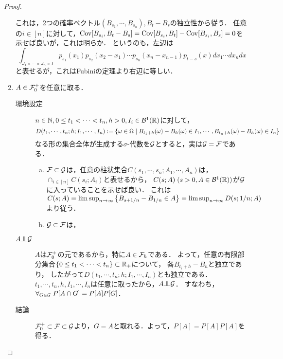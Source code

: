 \documentclass[uplatex,dvipdfmx]{jsreport}
\begin{document}
\begin{proof}
\begin{enumerate}
        これは，2つの確率ベクトル$(B_{s_1},\cdots,B_{s_n}),B_t-B_s$の独立性から従う．
        任意の$i\in[n]$に対して，$\mathrm{Cov}[B_{s_i},B_t-B_s]=\mathrm{Cov}[B_{s_i},B_t]-\mathrm{Cov}[B_{s_i},B_s]=0$を示せば良いが，これは明らか．
        というのも，左辺は
        \[\int_{J_1\times\cdots\times J_n\times I}p_{s_1}(x_1)p_{s_2}(x_2-x_1)\cdots p_{s_n}(x_n-x_{n-1})p_{t-s}(x)dx_1\cdots dx_ndx\]
        と表せるが，これはFubiniの定理より右辺に等しい．
        \item 
        $A\in\mathcal{F}^+_0$を任意に取る．
        \begin{description}
            \item[環境設定] $n\in\mathbb{N},0\le t_1<\cdots<t_n,h>0,I_i\in\mathcal{B}^1(\mathbb{R})$に対して，
            \[D(t_1,\cdots,t_n;h;I_1,\cdots,I_n):=\left\{\omega\in\Omega\mid B_{t_1+h}(\omega)-B_{h}(\omega)\in I_1,\cdots,B_{t_n+h}(\omega)-B_h(\omega)\in I_n\right\}\]
            なる形の集合全体が生成する$\sigma$-代数を$\mathcal{G}$とすると，実は$\mathcal{G}=\mathcal{F}$である．
            \begin{enumerate}[(a)]
                \item $\mathcal{F}\subset\mathcal{G}$は，任意の柱状集合$C(s_1,\cdots,s_n;A_1,\cdots,A_n)$は，$\cap_{i\in[n]}C(s_i;A_i)$と表せるから，
                $C(s;A)\;(s>0,A\in\mathcal{B}^1(\mathbb{R}))$が$\mathcal{G}$に入っていることを示せば良い．
                これは$C(s;A)=\limsup_{n\to\infty}\left\{B_{s+1/n}-B_{1/n}\in A\right\}=\limsup_{n\to\infty}D(s;1/n;A)$より従う．
                \item $\mathcal{G}\subset\mathcal{F}$は，
            \end{enumerate}
            \item[$A\indep\cG$] $A$は$\mathcal{F}^+_0$の元であるから，特に$A\in\mathcal{F}_h$である．
            よって，任意の有限部分集合$\{0\le t_1<\cdots<t_n\}\subset\mathbb{R}_+$について，
            各$B_{t_i+h}-B_{h}$と独立であり，
            したがって$D(t_1,\cdots,t_n;h;I_1,\cdots,I_n)$とも独立である．
            $t_1,\cdots,t_n,h,I_1,\cdots,I_n$は任意に取ったから，$A\indep\cG$．
            すなわち，$\forall_{G\in\mathcal{G}}\;P[A\cap G]=P[A]P[G]$．
            \item[結論] 
            $\mathcal{F}^+_0\subset\mathcal{F}\subset\mathcal{G}$より，$G=A$と取れる．よって，$P[A]=P[A]P[A]$を得る．
        \end{description}
    \end{enumerate}
\end{proof}
\end{document}
